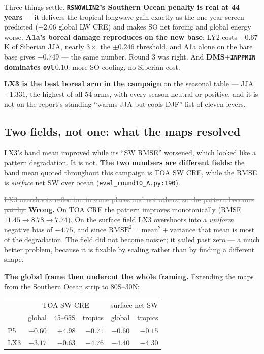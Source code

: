 \documentclass[10pt]{article}
\newcommand{\dead}[1]{\textcolor{gray}{\sout{#1}}}
\begin{document}
\noindent Three things settle. \textbf{\texttt{RSNOWLIN2}'s Southern Ocean penalty is real
at 44 years} --- it delivers the tropical longwave gain exactly as the one-year screen
predicted ($+2.06$ global LW CRE) and makes SO net forcing and global energy worse.
\textbf{A1a's boreal damage reproduces on the new base}: LY2 costs $-0.67$\,K of Siberian
JJA, nearly $3\times$ the $\pm0.246$ threshold, and A1a alone on the bare base gives
$-0.749$ --- the same number. Round 3 was right. And \textbf{DMS$+$\texttt{INPPMIN}
dominates \texttt{ovl}$\,0.10$}: more SO cooling, no Siberian cost.

\textbf{LX3 is the best boreal arm in the campaign} on the seasonal table --- JJA $+1.331$,
the highest of all 54 arms, with every season neutral or positive, and it is not on the
report's standing ``warms JJA but cools DJF'' list of eleven levers.

\subsection{Two fields, not one: what the maps resolved}\label{sub:r28maps}
LX3's band mean improved while its ``SW RMSE'' worsened, which looked like a pattern
degradation. It is not. \textbf{The two numbers are different fields}: the band mean
quoted throughout this campaign is TOA SW CRE, while the RMSE is \emph{surface} net SW over
ocean (\texttt{eval\_round10\_A.py:190}).

\dead{LX3 overshoots reflection in some places and not others, so the pattern becomes
patchy.} \textbf{Wrong.} On TOA CRE the pattern improves monotonically (RMSE
$11.45\to8.78\to7.74$). On the surface field LX3 overshoots into a \emph{uniform} negative
bias of $-4.75$, and since $\mathrm{RMSE}^2=\mathrm{mean}^2+\mathrm{variance}$ that mean is
most of the degradation. The field did not become noisier; it sailed past zero --- a much
better problem, because it is fixable by scaling rather than by finding a different shape.

\textbf{The global frame then undercut the whole framing.} Extending the maps from the
Southern Ocean strip to $80$S--$30$N:

\begin{center}\footnotesize
\begin{tabular}{l r r r r r}
\toprule
& \multicolumn{3}{c}{TOA SW CRE} & \multicolumn{2}{c}{surface net SW} \\
& global & 45--65S & tropics & global & tropics \\
\midrule
P5 & $+0.60$ & $+4.98$ & $-0.71$ & $-0.60$ & $-0.15$ \\
LX3 & $\mathbf{-3.17}$ & $-0.63$ & $\mathbf{-4.76}$ & $-4.40$ & $-4.30$ \\
\bottomrule
\end{tabular}
\end{center}
\end{document}

